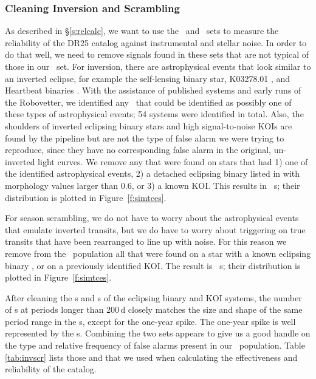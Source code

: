 \subsubsection{Cleaning Inversion and Scrambling}
\label{s:clean}
As described in \S\ref{s:relcalc}, we want to use the \invtce\ and \scrtce\ sets to measure the reliability of the DR25 catalog against instrumental and stellar noise. In order to do that well, we need to remove signals found in these sets that are not typical of those in our \opstce\ set. For inversion, there are astrophysical events that look similar to an inverted eclipse, for example the self-lensing binary star, K03278.01 \citep{Kruse2014}, and Heartbeat binaries \citep{Thompson2012}. With the assistance of published systems and early runs of the Robovetter, we identified any \invtce\ that could be identified as possibly one of these types of astrophysical events; 54 systems were identified in total. Also, the shoulders of inverted eclipsing binary stars and high signal-to-noise KOIs are found by the pipeline but are not the type of false alarm we were trying to reproduce, since they have no corresponding false alarm in the original, un-inverted light curves. We remove any  that were found on stars that had 1) one of the identified astrophysical events, 2) a detached eclipsing binary listed in \citet{Kirk2016} with morphology values larger than 0.6, or 3) a known KOI.  This results in \ninvtces\ \invtce s; their distribution is plotted in Figure~\ref{f:simtces}.

For season scrambling, we do not have to worry about the astrophysical events that emulate inverted transits, but we do have to worry about triggering on true transits that have been rearranged to line up with noise. For this reason we remove from the \scrtce\ population all that were found on a star with a known eclipsing binary \citep{Kirk2016}, or on a previously identified KOI. The result is \nscrtces\ \scrtce s; their distribution is plotted in Figure~\ref{f:simtces}. 

After cleaning the \invtce s and \scrtce s of the eclipsing binary and KOI systems, the number of \scrtce s at periods longer than 200\,d closely matches the size and shape of the same period range in the \opstce s, except for the one-year spike.  The one-year spike is well represented by the \invtce s.  Combining the two sets appears to give us a good handle on the type and relative frequency of false alarms present in our \opstce\ population. Table\,\ref{tab:invscr} lists those  and  that we used when calculating the effectiveness and reliability of the catalog.

